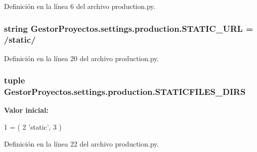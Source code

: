 Definición en la línea 6 del archivo production.\+py.

\subsubsection[{\texorpdfstring{S\+T\+A\+T\+I\+C\+\_\+\+U\+RL}{STATIC_URL}}]{\setlength{\rightskip}{0pt plus 5cm}string Gestor\+Proyectos.\+settings.\+production.\+S\+T\+A\+T\+I\+C\+\_\+\+U\+RL = \textquotesingle{}/static/\textquotesingle{}}\hypertarget{namespace_gestor_proyectos_1_1settings_1_1production_a71476a25631b511bc14e5beac309374e}{}\label{namespace_gestor_proyectos_1_1settings_1_1production_a71476a25631b511bc14e5beac309374e}


Definición en la línea 20 del archivo production.\+py.

\subsubsection[{\texorpdfstring{S\+T\+A\+T\+I\+C\+F\+I\+L\+E\+S\+\_\+\+D\+I\+RS}{STATICFILES_DIRS}}]{\setlength{\rightskip}{0pt plus 5cm}tuple Gestor\+Proyectos.\+settings.\+production.\+S\+T\+A\+T\+I\+C\+F\+I\+L\+E\+S\+\_\+\+D\+I\+RS}\hypertarget{namespace_gestor_proyectos_1_1settings_1_1production_abdddc5e88758d68ded15fc9860790ce0}{}\label{namespace_gestor_proyectos_1_1settings_1_1production_abdddc5e88758d68ded15fc9860790ce0}
{\bfseries Valor inicial\+:}
\begin{DoxyCode}
1 = (
2     \textcolor{stringliteral}{'static'},
3 )
\end{DoxyCode}


Definición en la línea 22 del archivo production.\+py.

